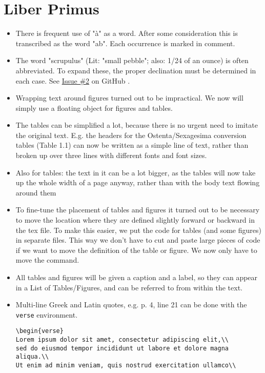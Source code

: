 \documentclass{report}
\newcommand{\SeeIssue}[1]{%
See \textcolor{blue}{%
\href{https://github.com/DomoViridi/Scaliger/issues/#1}%
{Issue \#{#1}}%
} on GitHub%
}
\begin{document}
\section{Liber Primus}
\begin{itemize}
\item
There is frequent use of "à" as a word. After some consideration this
is transcribed as the word "ab". Each occurrence is marked in comment.
\item
The word "scrupulus" (Lit: "small pebble"; also: 1/24 of an ounce)
is often abbreviated. To expand these, the proper
declination must be determined in each case. \SeeIssue{2}.
\item
Wrapping text around figures turned out to be impractical. We now will
simply use a floating object for figures and tables.
\item
The tables can be simplified
a lot, because there is no urgent need to imitate the original text.
E.g. the headers
for the Ostenta/Sexagesima conversion tables (Table 1.1) can now be written
as a simple line of text,
rather than broken up over three lines with different
fonts and font sizes.
\item
Also for tables: the text in it can be a lot bigger, as the tables
will now take up the whole width of a page anyway,
rather than with the body text flowing around them
\item
To fine-tune the placement of tables and figures it turned out to be
necessary to move the location where they are defined slightly forward or
backward in the tex file. To make this easier, we put the code for tables
 (and some figures) in separate files.
This way we don't have to cut and paste large pieces of code if we want to
move the definition of the table or figure. We now only have to move the
\verb++ command.
\item
All tables and figures will be given a caption and a label, so they can
appear in a List of Tables/Figures, and can be referred to from within the
text.
\item
Multi-line Greek and Latin quotes, e.g. p. 4, line 21
can be done with the \verb+verse+ environment.
\begin{verbatim}
\begin{verse}
Lorem ipsum dolor sit amet, consectetur adipiscing elit,\\
sed do eiusmod tempor incididunt ut labore et dolore magna aliqua.\\
Ut enim ad minim veniam, quis nostrud exercitation ullamco\\

\end{verbatim}
\end{itemize}
\end{document}
